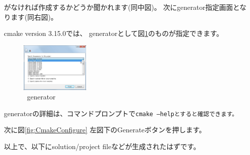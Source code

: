 \begin{narrow}[15pt]
	\build がなければ作成するかどうか聞かれます(同中図)。
	次にgenerator指定画面となります(同右図)。

	\medskip
	cmake version 3.15.0では、
	generatorとして図\ref{fig:CmakeGenerator}のものが指定できます。

	\begin{figure}[h]
	\begin{center}
	\includegraphics[width=0.3\textwidth]{fig/CmakeConfigure4.eps}
	\end{center}
	\caption{\cmake\ generator}
	\label{fig:CmakeGenerator}
	\end{figure}
	generatorの詳細は、コマンドプロンプトで\tt{cmake --help}とすると確認できます。

	次に図\ref{fig:CmakeConfigure} 左図下のGenerateボタンを押します。
\end{narrow}

\medskip
\noindent
以上で、\build 以下にsolution/project fileなどが生成されたはずです。

